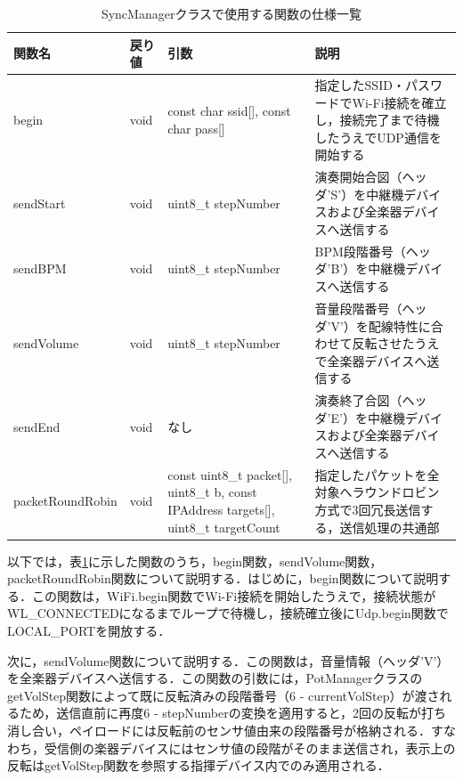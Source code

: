 \begin{table}[H]
    \caption{SyncManagerクラスで使用する関数の仕様一覧}
    \centering
    \label{table:siki_sync_func}
    \begin{tabular}{p{3.4cm}p{1.5cm}p{4.8cm}p{4.8cm}}
    \hline
    \textbf{関数名} & \textbf{戻り値} & \textbf{引数} & \textbf{説明}\\
    \hline
    begin & void & const char ssid[], const char pass[] & 指定したSSID・パスワードでWi-Fi接続を確立し，接続完了まで待機したうえでUDP通信を開始する\\
    \hline
    sendStart & void & uint8\_t stepNumber & 演奏開始合図（ヘッダ'S'）を中継機デバイスおよび全楽器デバイスへ送信する\\
    \hline
    sendBPM & void & uint8\_t stepNumber & BPM段階番号（ヘッダ'B'）を中継機デバイスへ送信する\\
    \hline
    sendVolume & void & uint8\_t stepNumber & 音量段階番号（ヘッダ'V'）を配線特性に合わせて反転させたうえで全楽器デバイスへ送信する\\
    \hline
    sendEnd & void & なし & 演奏終了合図（ヘッダ'E'）を中継機デバイスおよび全楽器デバイスへ送信する\\
    \hline
    packetRoundRobin & void & const uint8\_t packet[], uint8\_t b, const IPAddress targets[], uint8\_t targetCount & 指定したパケットを全対象へラウンドロビン方式で3回冗長送信する，送信処理の共通部\\
    \hline
    \end{tabular}
\end{table}

以下では，表\ref{table:siki_sync_func}に示した関数のうち，begin関数，sendVolume関数，packetRoundRobin関数について説明する．はじめに，begin関数について説明する．この関数は，WiFi.begin関数でWi-Fi接続を開始したうえで，接続状態がWL\_CONNECTEDになるまでループで待機し，接続確立後にUdp.begin関数でLOCAL\_PORTを開放する．


次に，sendVolume関数について説明する．この関数は，音量情報（ヘッダ'V'）を全楽器デバイスへ送信する．この関数の引数には，PotManagerクラスのgetVolStep関数によって既に反転済みの段階番号（6 - currentVolStep）が渡されるため，送信直前に再度6 - stepNumberの変換を適用すると，2回の反転が打ち消し合い，ペイロードには反転前のセンサ値由来の段階番号が格納される．すなわち，受信側の楽器デバイスにはセンサ値の段階がそのまま送信され，表示上の反転はgetVolStep関数を参照する指揮デバイス内でのみ適用される．

